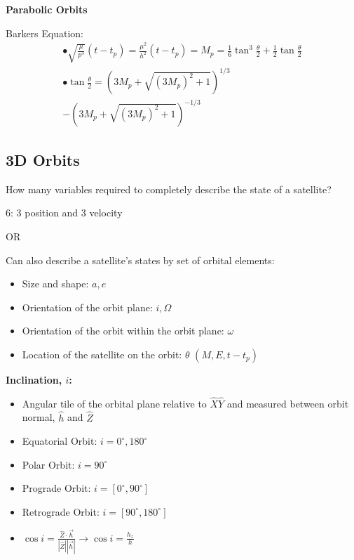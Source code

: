 \documentclass{article}
\begin{document}
\begin{multicols*}{3}
    \textbf{Parabolic Orbits}\par 
    Barkers Equation: 
        \begin{equation*}
            \begin{array}{l}
                \bullet \sqrt{\frac{\mu}{p^3}}(t-t_p)=\frac{\mu^2}{h^2}(t-t_p)=M_p=\frac{1}{6}\tan^3{\frac{\theta}{2}}+\frac{1}{2}\tan{\frac{\theta}{2}}\\
                \bullet \tan{\frac{\theta}{2}}=\left(3M_p+\sqrt{(3M_p)^2+1}\right)^{1/3}\\
                -\left(3M_p+\sqrt{(3M_p)^2+1}\right)^{-1/3}
            \end{array}
        \end{equation*}
    
    \subsection*{3D Orbits}
    How many variables required to completely describe the state of a satellite?\par 
    6: 3 position and 3 velocity\par 
    OR\par 
    Can also describe a satellite's states by set of orbital elements:
    \begin{itemize}
        \item Size and shape: $a,e$
        \item Orientation of the orbit plane: $i,\Omega$
        \item Orientation of the orbit within the orbit plane: $\omega$
        \item Location of the satellite on the orbit: $\theta$ $(M,E,t-t_p)$
    \end{itemize}

    \textbf{Inclination, $i$:}\par 
    \begin{itemize}
        \item Angular tile of the orbital plane relative to $\hat{X}\hat{Y}$ and measured 
        between orbit normal, $\hat{h}$ and $\hat{Z}$
        \item Equatorial Orbit: $i=0^\circ, 180^\circ$
        \item Polar Orbit: $i=90^\circ$
        \item Prograde Orbit: $i=[0^\circ,90^\circ]$
        \item Retrograde Orbit: $i=[90^\circ,180^\circ]$
        \item $\cos{i}=\frac{\hat{Z}\cdot\vec{h}}{|\hat{Z}||\vec{h}|}\rightarrow\cos{i}=\frac{h_z}{h}$
    \end{itemize}


\end{multicols*}
\end{document}
